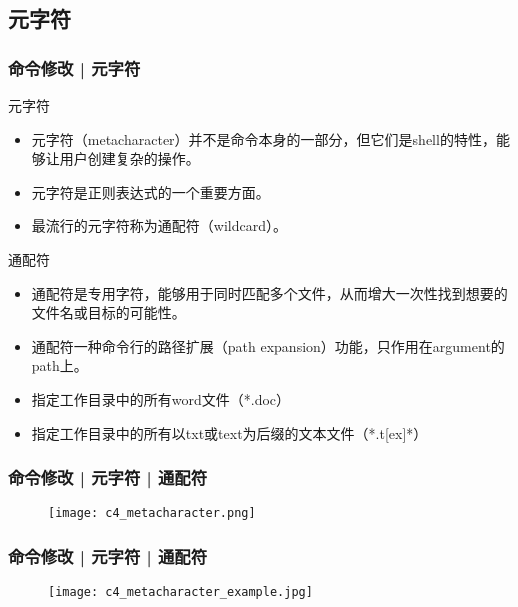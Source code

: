 \subsection{元字符}
\begin{frame}
  \frametitle{命令修改 | 元字符}
  \begin{block}{元字符}
    \begin{itemize}[<+->]
      \item 元字符（metacharacter）并不是命令本身的一部分，但它们是shell的特性，能够让用户创建复杂的操作。
      \item 元字符是正则表达式的一个重要方面。
      \item 最流行的元字符称为通配符（wildcard）。
    \end{itemize}
  \end{block}
  \pause
  \begin{block}{通配符}
    \begin{itemize}[<+->]
      \item 通配符是专用字符，能够用于同时匹配多个文件，从而增大一次性找到想要的文件名或目标的可能性。
      \item 通配符一种命令行的路径扩展（path expansion）功能，只作用在argument的path上。
      \item 指定工作目录中的所有word文件（*.doc）
      \item 指定工作目录中的所有以txt或text为后缀的文本文件（*.t[ex]*）
    \end{itemize}
  \end{block}
\end{frame}

\begin{frame}
  \frametitle{命令修改 | 元字符 | \alert{通配符}}
  \begin{figure}
    \centering
    \texttt{[image: c4\_metacharacter.png]}
  \end{figure}
\end{frame}

\begin{frame}
  \frametitle{命令修改 | 元字符 | 通配符}
  \begin{figure}
    \centering
    \texttt{[image: c4\_metacharacter\_example.jpg]}
  \end{figure}
\end{frame}

